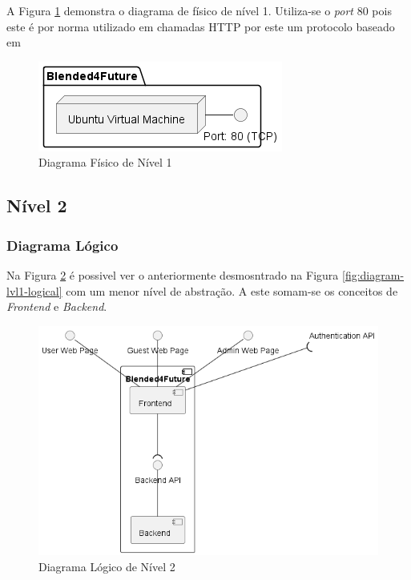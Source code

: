 A Figura \ref{fig:diagram-lvl1-physical} demonstra o diagrama de físico de nível 1. Utiliza-se o \textit{port} 80 pois este é por norma utilizado em chamadas \Acrshort{HTTP} por este um protocolo baseado em 

\begin{figure}[h!tbp]
    \centering
    \includegraphics[width=0.5\linewidth]{capitulos/cap3-analisedoproblema/assets/arquiteturasistema/physical/physical_l1.png}
    \caption{Diagrama Físico de Nível 1}
    \label{fig:diagram-lvl1-physical}
\end{figure}





\subsection{Nível 2}

\subsubsection{Diagrama Lógico}

Na Figura \ref{fig:diagram-lvl2-logical} é possivel ver o anteriormente desmosntrado na Figura \ref{fig:diagram-lvl1-logical} com um menor nível de abstração.
A este somam-se os conceitos de \textit{Frontend} e \textit{Backend}.

\begin{figure}[h!tbp]
    \centering
    \includegraphics[width=0.7\linewidth]{capitulos/cap3-analisedoproblema/assets/arquiteturasistema/logical/logical_l2.png}
    \caption{Diagrama Lógico de Nível 2}
    \label{fig:diagram-lvl2-logical}
\end{figure}

